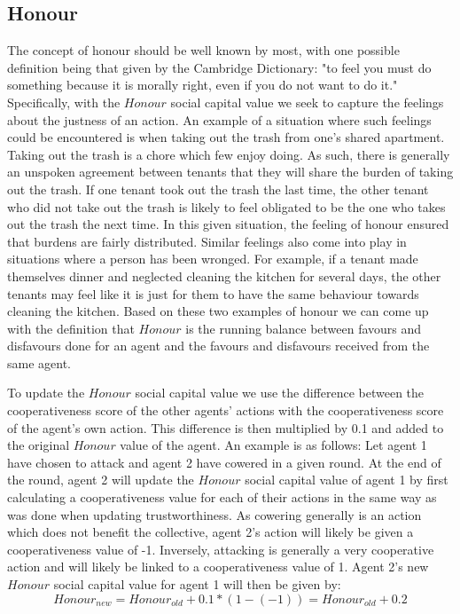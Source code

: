 \subsection{Honour}
\label{subsection:honour}

The concept of honour should be well known by most, with one possible definition being that given by the Cambridge Dictionary: "to feel you must do something because it is morally right, even if you do not want to do it." Specifically, with the $Honour$ social capital value we seek to capture the feelings about the justness of an action. An example of a situation where such feelings could be encountered is when taking out the trash from one's shared apartment. Taking out the trash is a chore which few enjoy doing. As such, there is generally an unspoken agreement between tenants that they will share the burden of taking out the trash. If one tenant took out the trash the last time, the other tenant who did not take out the trash is likely to feel obligated to be the one who takes out the trash the next time. In this given situation, the feeling of honour ensured that burdens are fairly distributed. Similar feelings also come into play in situations where a person has been wronged. For example, if a tenant made themselves dinner and neglected cleaning the kitchen for several days, the other tenants may feel like it is just for them to have the same behaviour towards cleaning the kitchen. Based on these two examples of honour we can come up with the definition that $Honour$ is the running balance between favours and disfavours done for an agent and the favours and disfavours received from the same agent. 

To update the $Honour$ social capital value we use the difference between the cooperativeness score of the other agents' actions with the cooperativeness score of the agent's own action. This difference is then multiplied by 0.1 and added to the original $Honour$ value of the agent. An example is as follows: Let agent 1 have chosen to attack and agent 2 have cowered in a given round. At the end of the round, agent 2 will update the $Honour$ social capital value of agent 1 by first calculating a cooperativeness value for each of their actions in the same way as was done when updating trustworthiness. As cowering generally is an action which does not benefit the collective, agent 2's action will likely be given a cooperativeness value of -1. Inversely, attacking is generally a very cooperative action and will likely be linked to a cooperativeness value of 1. Agent 2's new $Honour$ social capital value for agent 1 will then be given by:
\begin{equation}
    Honour_{new} = Honour_{old} + 0.1*(1 - (-1)) = Honour_{old} + 0.2
\end{equation}

